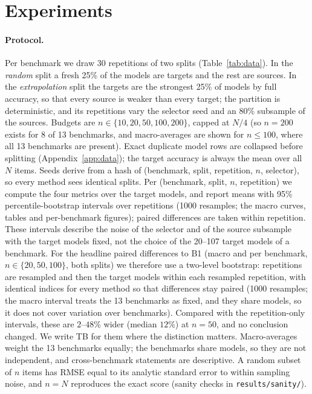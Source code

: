 \section{Experiments}
\label{sec:exp}

\paragraph{Protocol.}
Per benchmark we draw 30 repetitions of two splits (Table~\ref{tab:data}). In the \emph{random} split a fresh 25\% of the models are targets and the rest are sources. In the \emph{extrapolation} split the targets are the strongest 25\% of models by full accuracy, so that every source is weaker than every target; the partition is deterministic, and its repetitions vary the selector seed and an 80\% subsample of the sources. Budgets are $n\in\{10,20,50,100,200\}$, capped at $N/4$ (so $n{=}200$ exists for 8 of 13 benchmarks, and macro-averages are shown for $n\le 100$, where all 13 benchmarks are present). Exact duplicate model rows are collapsed before splitting (Appendix~\ref{app:data}); the target accuracy is always the mean over all $N$ items. Seeds derive from a hash of (benchmark, split, repetition, $n$, selector), so every method sees identical splits. Per (benchmark, split, $n$, repetition) we compute the four metrics over the target models, and report means with 95\% percentile-bootstrap intervals over repetitions (1000 resamples; the macro curves, tables and per-benchmark figures); paired differences are taken within repetition. These intervals describe the noise of the selector and of the source subsample with the target models fixed, not the choice of the 20--107 target models of a benchmark. For the headline paired differences to B1 (macro and per benchmark, $n\in\{20,50,100\}$, both splits) we therefore use a two-level bootstrap: repetitions are resampled and then the target models within each resampled repetition, with identical indices for every method so that differences stay paired (1000 resamples; the macro interval treats the 13 benchmarks as fixed, and they share models, so it does not cover variation over benchmarks). Compared with the repetition-only intervals, these are $2$--$48$\% wider (median $12$\%) at $n{=}50$, and no conclusion changed. We write TB for them where the distinction matters. Macro-averages weight the 13 benchmarks equally; the benchmarks share models, so they are not independent, and cross-benchmark statements are descriptive. A random subset of $n$ items has RMSE equal to its analytic standard error to within sampling noise, and $n=N$ reproduces the exact score (sanity checks in \texttt{results/sanity/}).

